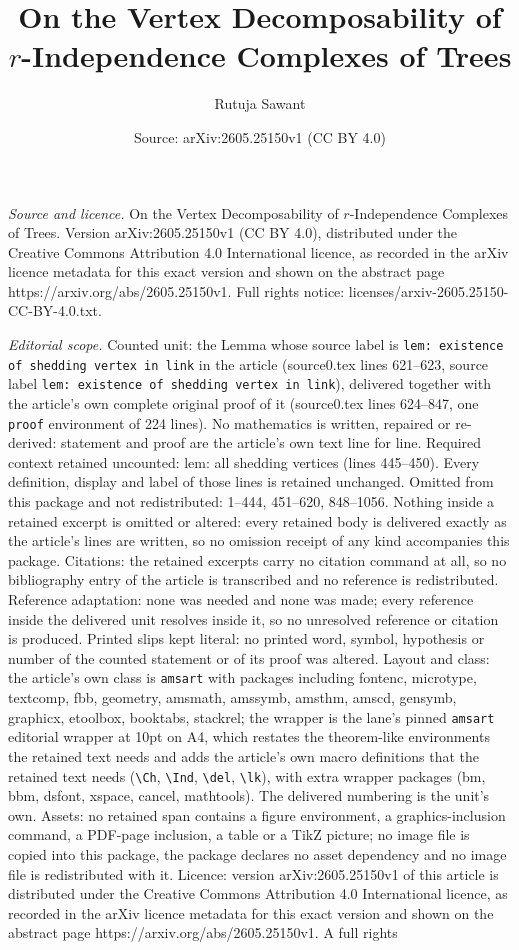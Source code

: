 \documentclass[10pt,a4paper]{amsart}
\title[On the Vertex Decomposability of $r$-Independence Complexes ]{On the Vertex Decomposability of $r$-Independence Complexes of Trees}
\author{Rutuja Sawant}
\date{Source: arXiv:2605.25150v1 (CC BY 4.0)}
\begin{document}
\maketitle

\noindent\emph{Source and licence.} On the Vertex Decomposability of $r$-Independence Complexes of Trees. Version arXiv:2605.25150v1 (CC BY 4.0), distributed under the Creative Commons Attribution 4.0 International licence, as recorded in the arXiv licence metadata for this exact version and shown on the abstract page https://arxiv.org/abs/2605.25150v1. Full rights notice: licenses/arxiv-2605.25150-CC-BY-4.0.txt.\par\smallskip

\noindent\textit{Editorial scope.} Counted unit: the Lemma whose source label is \texttt{lem: existence of shedding vertex in link} in the article (source0.tex lines 621--623, source label \texttt{lem: existence of shedding vertex in link}), delivered together with the article's own complete original proof of it (source0.tex lines 624--847, one \texttt{proof} environment of 224 lines). No mathematics is written, repaired or re-derived: statement and proof are the article's own text line for line. Required context retained uncounted: lem: all shedding vertices (lines 445--450). Every definition, display and label of those lines is retained unchanged. Omitted from this package and not redistributed: 1--444, 451--620, 848--1056. Nothing inside a retained excerpt is omitted or altered: every retained body is delivered exactly as the article's lines are written, so no omission receipt of any kind accompanies this package. Citations: the retained excerpts carry no citation command at all, so no bibliography entry of the article is transcribed and no reference is redistributed. Reference adaptation: none was needed and none was made; every reference inside the delivered unit resolves inside it, so no unresolved reference or citation is produced. Printed slips kept literal: no printed word, symbol, hypothesis or number of the counted statement or of its proof was altered. Layout and class: the article's own class is \texttt{amsart} with packages including fontenc, microtype, textcomp, fbb, geometry, amsmath, amssymb, amsthm, amscd, gensymb, graphicx, etoolbox, booktabs, stackrel; the wrapper is the lane's pinned \texttt{amsart} editorial wrapper at 10pt on A4, which restates the theorem-like environments the retained text needs and adds the article's own macro definitions that the retained text needs (\texttt{\textbackslash Ch}, \texttt{\textbackslash Ind}, \texttt{\textbackslash del}, \texttt{\textbackslash lk}), with extra wrapper packages (bm, bbm, dsfont, xspace, cancel, mathtools). The delivered numbering is the unit's own. Assets: no retained span contains a figure environment, a graphics-inclusion command, a PDF-page inclusion, a table or a TikZ picture; no image file is copied into this package, the package declares no asset dependency and no image file is redistributed with it. Licence: version arXiv:2605.25150v1 of this article is distributed under the Creative Commons Attribution 4.0 International licence, as recorded in the arXiv licence metadata for this exact version and shown on the abstract page https://arxiv.org/abs/2605.25150v1. A full rights 
\end{document}
